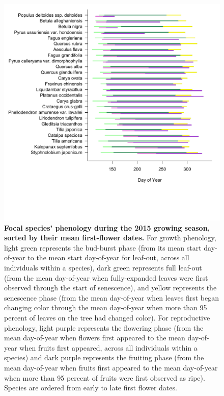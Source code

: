 \documentclass{article}
\begin{document}
\begin{figure}[h]
  \centering
  \includegraphics{../analyses/figures/grosea_repsort.pdf}
  \caption{\textbf{Focal species' phenology during the 2015 growing season, sorted by their mean first-flower dates.} For growth phenology, light green represents the bud-burst phase (from its mean start day-of-year to the mean start day-of-year for leaf-out, across all individuals within a species), dark green represents full leaf-out (from the mean day-of-year when fully-expanded leaves were first observed through the start of senescence), and yellow represents the senescence phase (from the mean day-of-year when leaves first began changing color through the mean day-of-year when more than 95 percent of leaves on the tree had changed color). For reproductive phenology, light purple represents the flowering phase (from the mean day-of-year when flowers first appeared to the mean day-of-year when fruits first appeared, across all individuals within a species) and dark purple represents the fruiting phase (from the mean day-of-year when fruits first appeared to the mean day-of-year when more than 95 percent of fruits were first observed as ripe). Species are ordered from early to late first flower dates.}
  \label{fig:focsp}
\end{figure}
  
\end{document}
